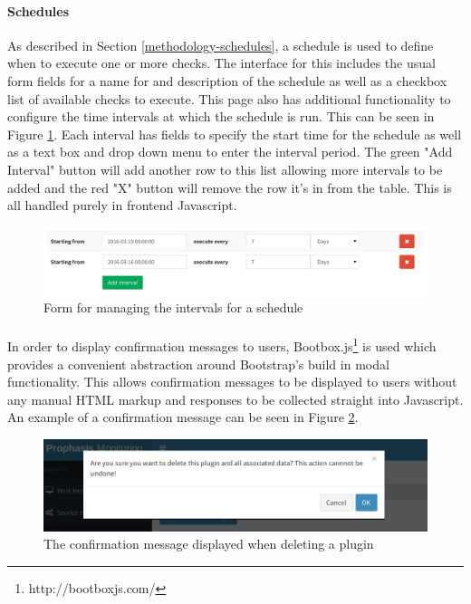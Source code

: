 \documentclass[bsc,logo,twoside,singlespacing]{infthesis}
\begin{document}
\paragraph*{Schedules}
	As described in Section \ref{methodology-schedules}, a schedule is used to
	define when to execute one or more checks.  The interface for this includes the
	usual form fields for a name for and description of the schedule as well as a
	checkbox list of available checks to execute.  This page also has additional
	functionality to configure the time intervals at which the schedule is run. This
	can be seen in Figure \ref{schedule-intervals}.  Each interval has fields to
	specify the start time for the schedule as well as a text box and drop down menu
	to enter the interval period.  The green "Add Interval" button will add another
	row to this list allowing more intervals to be added and the red "X" button will
	remove the row it's in from the table.  This is all handled purely in frontend
	Javascript.
	
\begin{figure}[H]
	\caption{Form for managing the intervals for a schedule}
	\label{schedule-intervals}
	\includegraphics[scale=0.54]{assets/screenshots/schedule-intervals.pdf}
\end{figure}

\paragraph*{}
	In order to display confirmation messages to users,
	Bootbox.js\footnote{http://bootboxjs.com/} is used which provides a convenient
	abstraction around Bootstrap's build in modal functionality.  This allows
	confirmation messages to be displayed to users without any manual HTML markup
	and responses to be collected straight into Javascript.  An example of a
	confirmation message can be seen in Figure \ref{bootbox-delete}.

\begin{figure}[H]
	\centering
	\caption{The confirmation message displayed when deleting a plugin}
	\label{bootbox-delete}
	\includegraphics[scale=0.6]{assets/screenshots/bootbox-delete.pdf}
\end{figure}
\end{document}
